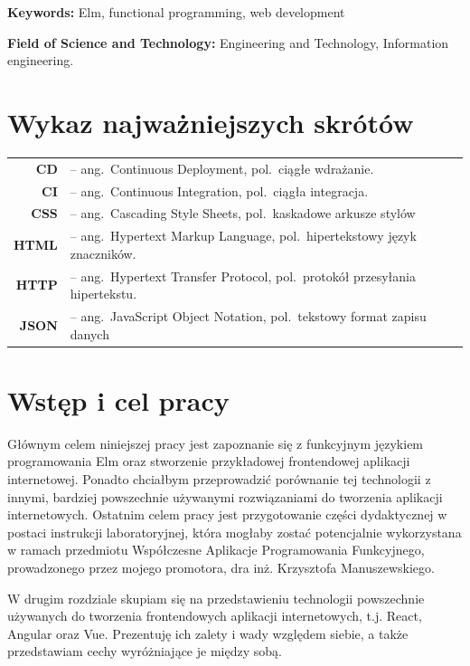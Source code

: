 \documentclass[twoside,a4paper]{report}
\begin{document}
\textbf{Keywords:} Elm, functional programming, web development

\textbf{Field of Science and Technology:} Engineering and Technology, Information engineering.

\tableofcontents


\chapter*{Wykaz najważniejszych skrótów}
\begin{tabular}{rl}
    \textbf{CD} &-- ang.~Continuous Deployment, pol.~ciągłe wdrażanie.\\
    \textbf{CI} &-- ang.~Continuous Integration, pol.~ciągła integracja.\\
    \textbf{CSS} &-- ang.~Cascading Style Sheets, pol.~kaskadowe arkusze stylów\\
    \textbf{HTML} &-- ang.~Hypertext Markup Language, pol.~hipertekstowy język znaczników.\\
    \textbf{HTTP} &-- ang.~Hypertext Transfer Protocol, pol.~protokół przesyłania hipertekstu.\\
    \textbf{JSON} &-- ang.~JavaScript Object Notation, pol.~tekstowy format zapisu danych\\
\end{tabular}


\chapter{Wstęp i cel pracy}
Głównym celem niniejszej pracy jest zapoznanie się z funkcyjnym językiem programowania Elm oraz stworzenie przykładowej frontendowej aplikacji internetowej.
Ponadto chciałbym przeprowadzić porównanie tej technologii z innymi, bardziej powszechnie używanymi rozwiązaniami do tworzenia aplikacji internetowych.
Ostatnim celem pracy jest przygotowanie części dydaktycznej w postaci instrukcji laboratoryjnej, która mogłaby zostać potencjalnie wykorzystana w ramach przedmiotu Współczesne Aplikacje Programowania Funkcyjnego, prowadzonego przez mojego promotora, dra inż. Krzysztofa Manuszewskiego.

W drugim rozdziale skupiam się na przedstawieniu technologii powszechnie używanych do tworzenia frontendowych aplikacji internetowych, t.j. React, Angular oraz Vue.
Prezentuję ich zalety i wady względem siebie, a także przedstawiam cechy wyróżniające je między sobą.
\end{document}

